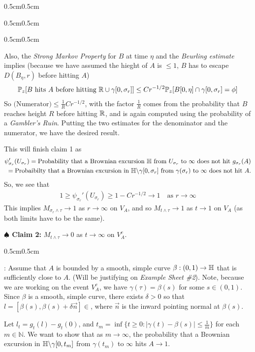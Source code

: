 \documentclass[12pt,a4paper]{article}
\newenvironment{proof}
{\begin{changemargin}{0.5cm}{0.5cm} 
	}%
	{\end{changemargin}
}
\newenvironment{subproof}
{\begin{changemargin}{0.5cm}{0.5cm} 
	}%
	{\end{changemargin}
}
\newenvironment{p}
{\begin{proof} 
	}%
	{\end{proof}
}
\begin{document}
\begin{p}
\begin{subproof}
\begin{subproof}
Also, the \emph{Strong Markov Property} for $B$ at time $\eta$ and the \emph{Beurling estimate} implies (because we have assumed the hieght of $A$ is $\leq 1$, $B$ has to escape $D(B_{\eta}, r)$ before hitting $A$)
\begin{align*}
\mathbb{P}_z [B\text{ hits }A\text{ before hitting } \mathbb{R}\cup \gamma[0, \sigma_r]] \leq C r^{-1/2} \mathbb{P}_z [B[0, \eta] \cap \gamma [0, \sigma_r] = \phi]
\end{align*}
So $\text{(Numerator)} \leq \frac{1}{R} Cr^{-1/2}$, with the factor $\frac{1}{R}$ comes from the probability that $B$ reaches height $R$ before hitting $\mathbb{R}$, and is again computed using the probability of a \emph{Gambler's Ruin}. Putting the two estimates for the denominator and the numerator, we have the desired result.
\end{subproof}
This will finish claim 1 as 
\begin{align*}
\psi'_{\sigma_r} (U_{\sigma_r}) = \text{Probability that a Brownian excursion }\mathbb{H}\text{ from }U_{\sigma_r}\text{ to }\infty\text{ does not hit }g_{\sigma_r}(A)\\
=\text{Probaibilty that a Brownian excursion in }\mathbb{H} \backslash \gamma [0, \sigma_r]\text{ from }\gamma(\sigma_r)\text{ to }\infty\text{ does not hit }A. 
\end{align*}
So, we see that
\begin{align*}
1\geq \psi_{\sigma_r}'(U_{\sigma_r}) \geq 1- Cr^{-1/2} \rightarrow 1 \quad \text{as } r\rightarrow \infty
\end{align*}
This implies $M_{\sigma_r \wedge \tau} \rightarrow 1$ as $r \rightarrow \infty$ on $V_A$, and so $M_{t\wedge \tau} \rightarrow 1$ as $t \rightarrow 1$ on $V_A$ (as both limits have to be the same).   
\end{subproof}
\textbf{$\spadesuit$ Claim 2:} $M_{t\wedge \tau} \rightarrow 0$ as $t\rightarrow \infty$ on $V_A^c$.
\begin{subproof}
: Assume that $A$ is bounded by a smooth, simple curve $\beta : (0, 1) \rightarrow \mathbb{H}$ that is sufficiently close to $A$. (Will be justifying on \emph{Example Sheet \#2}). Note, because we are working on the event $V_A^c$, we have $\gamma(\tau) = \beta(s)$ for some $s\in (0,1)$. Since $\beta$ is a smooth, simple curve, there exists $\delta >0$ so that $l = [\beta(s), \beta(s) + \delta \vec{n}]\in $, where $\vec{n}$ is the inward pointing normal at $\beta(s)$.

\quad Let $l_t =g_t(l) -g_t(0)$, and $t_m = \inf\{t\geq 0 : |\gamma(t) -\beta(s)| \leq \frac{1}{m} \}$ for each $m\in \mathbb{N}$. We want to show that as $m\rightarrow \infty$, the probability that a Brownian excursion in $\mathbb{H} \backslash \gamma [0, t_m]$ from $\gamma(t_m)$ to $\infty$ hits $A \rightarrow 1$.


\end{subproof}
\end{p}
\end{document}
